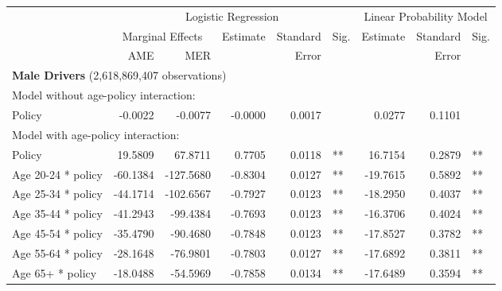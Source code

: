 
\begin{table}%
\centering 
\begin{tabular}{l r r r r l r r l} 

\hline 
 
 & \multicolumn{5}{c}{Logistic Regression}  & \multicolumn{3}{c}{Linear Probability Model} \\ 

 \cmidrule(lr){2-6}\cmidrule(lr){7-9} 
 & \multicolumn{2}{c}{Marginal Effects} & Estimate & Standard & Sig. & Estimate & Standard & Sig. \\ 

 \cmidrule(lr){2-3} 
 &   AME &  MER  &          &  Error   &      &          &  Error   &     \\ 

\hline 
 
\multicolumn{8}{l}{\textbf{Male Drivers} (2,618,869,407 observations)} \\ 

\hline
\multicolumn{8}{l}{Model without age-policy interaction: } \\ 
Policy                   &  -0.0022        &  -0.0077       &  -0.0000        &  0.0017       &            &  0.0277        &  0.1101       &            \\ 
\hline
\multicolumn{8}{l}{Model with age-policy interaction: } \\ 
Policy                   &  19.5809        &  67.8711       &  0.7705        &  0.0118       &   **       &  16.7154        &  0.2879       &   **       \\ 
Age 20-24 * policy   &  -60.1384        &  -127.5680       &  -0.8304        &  0.0127       &   **       &  -19.7615        &  0.5892       &   **       \\ 
Age 25-34 * policy   &  -44.1714        &  -102.6567       &  -0.7927        &  0.0123       &   **       &  -18.2950        &  0.4037       &   **       \\ 
Age 35-44 * policy   &  -41.2943        &  -99.4384       &  -0.7693        &  0.0123       &   **       &  -16.3706        &  0.4024       &   **       \\ 
Age 45-54 * policy   &  -35.4790        &  -90.4680       &  -0.7848        &  0.0123       &   **       &  -17.8527        &  0.3782       &   **       \\ 
Age 55-64 * policy   &  -28.1648        &  -76.9801       &  -0.7803        &  0.0127       &   **       &  -17.6892        &  0.3811       &   **       \\ 
Age 65+ * policy   &  -18.0488        &  -54.5969       &  -0.7858        &  0.0134       &   **       &  -17.6489        &  0.3594       &   **       \\ 


\end{tabular}
\end{table}
